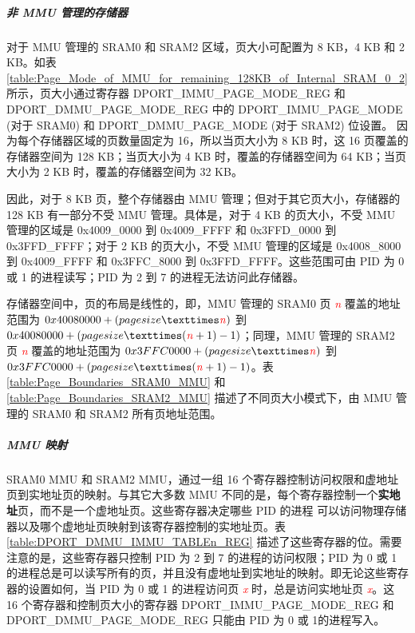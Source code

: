 \subparagraph{非 MMU 管理的存储器}
对于 MMU 管理的 SRAM0 和 SRAM2 区域，页大小可配置为 8 KB，4 KB 和 2 KB。如表 \ref{table:Page_Mode_of_MMU_for_remaining_128KB_of_Internal_SRAM_0_2} 所示，页大小通过寄存器 DPORT\_IMMU\_PAGE\_MODE\_REG 和 DPORT\_DMMU\_PAGE\_MODE\_REG 中的 DPORT\_IMMU\_PAGE\_MODE (对于 SRAM0) 和 DPORT\_DMMU\_PAGE\_MODE (对于 SRAM2) 位设置。
因为每个存储器区域的页数量固定为 16，所以当页大小为 8 KB 时，这 16 页覆盖的存储器空间为 128 KB；当页大小为 4 KB 时，覆盖的存储器空间为 64 KB；当页大小为 2 KB 时，覆盖的存储器空间为 32 KB。

因此，对于 8 KB 页，整个存储器由 MMU 管理；但对于其它页大小，存储器的 128 KB 有一部分不受 MMU 管理。具体是，对于 4 KB 的页大小，不受 MMU 管理的区域是 0x4009\_0000 到 0x4009\_FFFF 和 0x3FFD\_0000 到 0x3FFD\_FFFF；对于 2 KB 的页大小，不受 MMU 管理的区域是 0x4008\_8000 到 0x4009\_FFFF 和 0x3FFC\_8000 到 0x3FFD\_FFFF。这些范围可由 PID 为 0 或 1 的进程读写；PID 为 2 到 7 的进程无法访问此存储器。
 
存储器空间中，页的布局是线性的，即，MMU 管理的 SRAM0 页 \textcolor{red}{\it{n}} 覆盖的地址范围为 $0x40080000+(pagesize×\textcolor{red}{\it{n}})$ 到 $0x40080000+(pagesize×(\textcolor{red}{\it{n}}+1)-1)$；同理，MMU 管理的 SRAM2 页 \textcolor{red}{\it{n}} 覆盖的地址范围为 $0x3FFC0000+(pagesize×\textcolor{red}{\it{n}})$ 到 $0x3FFC0000+(pagesize×(\textcolor{red}{\it{n}}+1)-1)$。表 \ref{table:Page_Boundaries_SRAM0_MMU} 和 \ref{table:Page_Boundaries_SRAM2_MMU} 描述了不同页大小模式下，由 MMU 管理的 SRAM0 和 SRAM2 所有页地址范围。



\subparagraph{MMU 映射}

SRAM0 MMU 和 SRAM2 MMU，通过一组 16 个寄存器控制访问权限和虚地址页到实地址页的映射。与其它大多数 MMU 不同的是，每个寄存器控制一个\textbf{实地址}页，而不是一个虚地址页。这些寄存器决定哪些 PID 的进程 可以访问物理存储器以及哪个虚地址页映射到该寄存器控制的实地址页。表 \ref{table:DPORT_DMMU_IMMU_TABLEn_REG} 描述了这些寄存器的位。需要注意的是，这些寄存器只控制 PID 为 2 到 7 的进程的访问权限；PID 为 0 或 1 的进程总是可以读写所有的页，并且没有虚地址到实地址的映射。即无论这些寄存器的设置如何，当 PID 为 0 或 1 的进程访问页 \textcolor{red}{\it{x}} 时，总是访问实地址页 \textcolor{red}{\it{x}}。这 16 个寄存器和控制页大小的寄存器 DPORT\_IMMU\_PAGE\_MODE\_REG 和 DPORT\_DMMU\_PAGE\_MODE\_REG 只能由 PID 为 0 或 1的进程写入。




